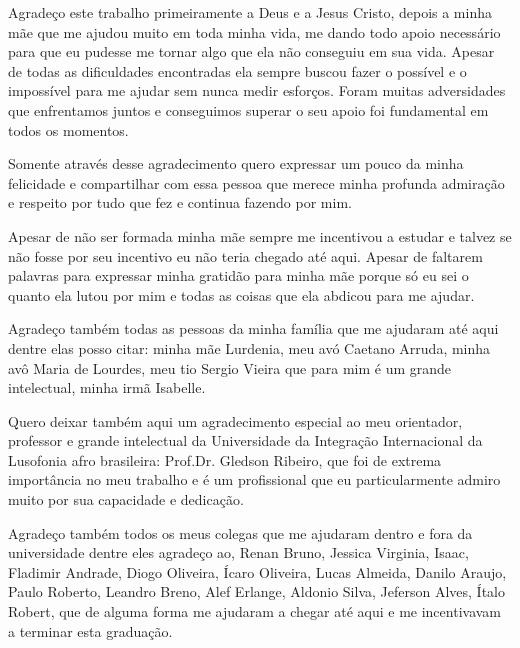 \documentclass[pnumabnt,normaltoc,espacoumemeio,capchap]{abnt}
\begin{document}
\capa
\folhaderosto
\makecippage
\termodeaprovacao

\makededicatoria

Agradeço este trabalho primeiramente a Deus e a Jesus Cristo, depois a minha mãe que me ajudou 
muito em toda minha vida, me dando todo apoio necessário para que eu pudesse me tornar algo que 
ela não conseguiu em sua vida. Apesar de todas as dificuldades encontradas ela sempre buscou 
fazer o possível e o impossível para me ajudar sem nunca medir esforços. Foram muitas adversidades 
que enfrentamos juntos e conseguimos superar o seu apoio foi fundamental em todos os momentos.

Somente através desse agradecimento quero expressar um pouco da minha felicidade e compartilhar 
com essa pessoa que merece minha profunda admiração e respeito por tudo que fez e continua fazendo por mim.

Apesar de não ser formada minha mãe sempre me incentivou a estudar e talvez se não fosse por seu 
incentivo eu não teria chegado até aqui. Apesar de faltarem palavras para expressar minha gratidão 
para minha mãe porque só eu sei o quanto ela lutou por mim e todas as coisas que ela abdicou para me ajudar.

Agradeço também todas as pessoas da minha família que me ajudaram até aqui dentre elas posso citar: 
minha mãe Lurdenia, meu avó Caetano Arruda, minha avô Maria de Lourdes, meu tio Sergio Vieira que 
para mim é um grande intelectual, minha irmã Isabelle.

Quero deixar também aqui um agradecimento especial ao meu orientador, professor e grande intelectual 
da Universidade da Integração Internacional da Lusofonia afro brasileira: Prof.Dr. Gledson Ribeiro, que 
foi de extrema importância no meu trabalho e é um profissional que eu particularmente admiro muito 
por sua capacidade e dedicação.

Agradeço também todos os meus colegas que me ajudaram dentro e fora da universidade dentre eles agradeço 
ao, Renan Bruno, Jessica Virginia, Isaac, Fladimir Andrade, Diogo Oliveira, Ícaro Oliveira, Lucas Almeida, 
Danilo Araujo, Paulo Roberto, Leandro Breno, Alef Erlange, Aldonio Silva, Jeferson Alves, Ítalo Robert, 
que de alguma forma me ajudaram a chegar até aqui e me incentivavam a terminar esta graduação.

\pagebreak


\tableofcontents








%
\end{document}
